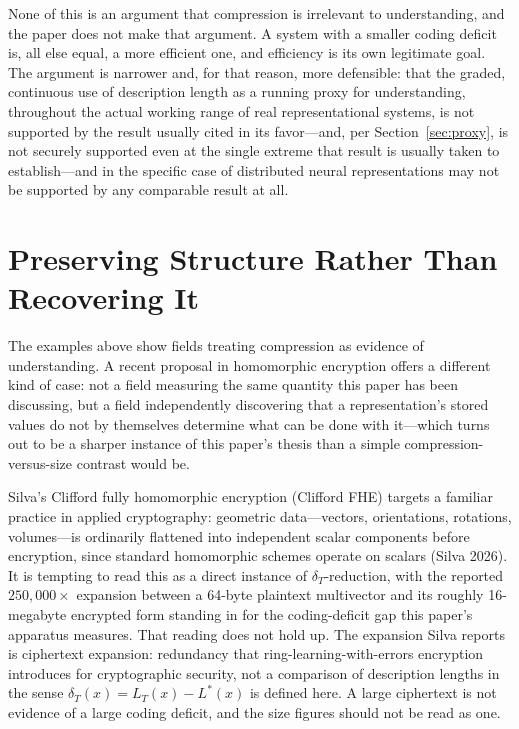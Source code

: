 \documentclass[11pt]{article}
\theoremstyle{plain}
\begin{document}
None of this is an argument that compression is irrelevant to understanding, and the paper does not make that argument. A system with a smaller coding deficit is, all else equal, a more efficient one, and efficiency is its own legitimate goal. The argument is narrower and, for that reason, more defensible: that the graded, continuous use of description length as a running proxy for understanding, throughout the actual working range of real representational systems, is not supported by the result usually cited in its favor---and, per Section~\ref{sec:proxy}, is not securely supported even at the single extreme that result is usually taken to establish---and in the specific case of distributed neural representations may not be supported by any comparable result at all.

\section{Preserving Structure Rather Than Recovering It}
\label{sec:converse}

The examples above show fields treating compression as evidence of understanding. A recent proposal in homomorphic encryption offers a different kind of case: not a field measuring the same quantity this paper has been discussing, but a field independently discovering that a representation's stored values do not by themselves determine what can be done with it---which turns out to be a sharper instance of this paper's thesis than a simple compression-versus-size contrast would be.

Silva's Clifford fully homomorphic encryption (Clifford FHE) targets a familiar practice in applied cryptography: geometric data---vectors, orientations, rotations, volumes---is ordinarily flattened into independent scalar components before encryption, since standard homomorphic schemes operate on scalars (Silva 2026). It is tempting to read this as a direct instance of $\delta_T$-reduction, with the reported $250{,}000\times$ expansion between a 64-byte plaintext multivector and its roughly 16-megabyte encrypted form standing in for the coding-deficit gap this paper's apparatus measures. That reading does not hold up. The expansion Silva reports is ciphertext expansion: redundancy that ring-learning-with-errors encryption introduces for cryptographic security, not a comparison of description lengths in the sense $\delta_T(x) = L_T(x) - L^*(x)$ is defined here. A large ciphertext is not evidence of a large coding deficit, and the size figures should not be read as one.
\end{document}
